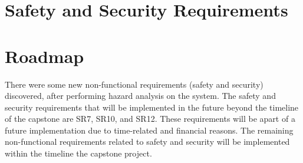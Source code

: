 \documentclass{article}
\begin{document}
\newpage

\section{Safety and Security Requirements}


\section{Roadmap}

There were some new non-functional requirements (safety and security) discovered, 
after performing hazard analysis on the system. The safety and security requirements 
that will be implemented in the future beyond the timeline of the capstone are SR7, 
SR10, and SR12. These requirements will be apart of a future implementation due to 
time-related and financial reasons. The remaining non-functional requirements related 
to safety and security will be implemented within the timeline the capstone project.
\end{document}
